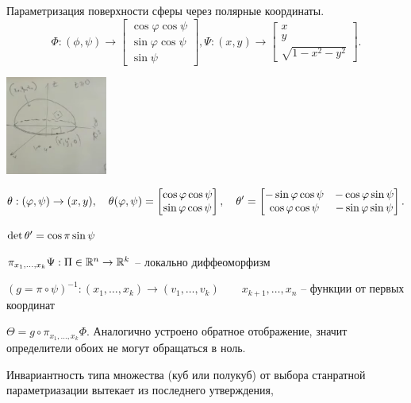 \begin{example} Параметризация поверхности сферы через полярные координаты.
    \[ \Phi: (\phi, \psi) \to \begin{bmatrix} \cos\varphi\cos\psi \\ \sin\varphi\cos\psi \\ \sin\psi \end{bmatrix},
    \Psi: (x,y) \to \begin{bmatrix} x \\ y \\ \sqrt{1 - x^2 - y^2}  \end{bmatrix}.\]

    \begin{center}\includegraphics[width=0.25\textwidth]{img/parmetrization-surface-of-sphere.png}
    \end{center}

    \[ \theta: (\varphi, \psi) \to (x,y),~~~
    \theta(\varphi, \psi) = \begin{bmatrix} \cos\varphi\cos\psi \\ \sin\varphi\cos\psi \end{bmatrix},~~~
    \theta^{\prime} = \begin{bmatrix}
        -\sin\varphi\cos\psi & -\cos\varphi\sin\psi \\
        \cos\varphi\cos\psi & -\sin\varphi\sin\psi\\
    \end{bmatrix}. \]

    $\det \theta^{\prime} = \cos\pi\sin\psi$

    $\pi_{x_1, \ldots, x_k}\Psi : \Pi\in \mathbb{R}^n \to \mathbb{R}^k$ -- локально диффеоморфизм

    $(g = \pi \circ \psi)^{-1}: (x_1, \ldots, x_k) \to (v_1, \ldots, v_k)\qquad x_{k+1}, \ldots, x_n$ -- функции от первых координат

    $\Theta = g \circ \pi_{x_1, \ldots, x_k}\Phi$. Аналогично устроено обратное отображение, значит определители обоих не могут обращаться в ноль.
\end{example}

\begin{corollary}
    Инвариантность типа множества (куб или полукуб) от выбора станратной параметриазации вытекает из последнего утверждения,
\end{corollary}

